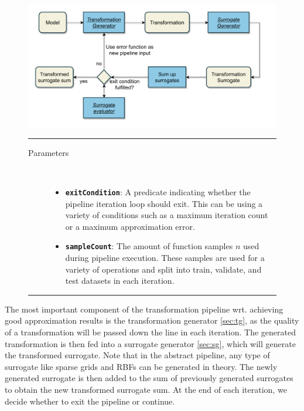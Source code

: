 \documentclass[
  a4paper,  %
  twoside,  %
  bibliography=totoc,
  headsepline,
  cleardoublepage=empty,
  parskip=half,
  draft=false
]{scrbook}
\newcommand{\delimit}{{\color{charcoal}\noindent\rule{\textwidth}{1pt}}}
\begin{document}
\begin{mdframed}[style=style,frametitle={Transformation Pipeline}]
\begin{figure}[H]

\includegraphics[width=\textwidth]{graphics/TransformationPipeline.pdf}
\vspace{-7.5mm}

\delimit

\begin{description}
\item[Parameters] {~ \begin{itemize}[\indent{}]
\item \texttt{\textbf{exitCondition}}: A predicate indicating whether the pipeline iteration loop should exit. This can be using a variety of conditions such as a maximum iteration count or a maximum approximation error.
\item \texttt{\textbf{sampleCount}}: The amount of function samples $n$ used during pipeline execution. These samples are used for a variety of operations and split into train, validate, and test datasets in each iteration.
\end{itemize}}
\end{description}

\delimit

\label{fig:tp}
\end{figure}
\end{mdframed}

The most important component of the transformation pipeline wrt. achieving good approximation results is the transformation generator \cref{sec:tg}, as the quality of a transformation will be passed down the line in each iteration.
The generated transformation is then fed into a surrogate generator \cref{sec:sg}, which will generate the transformed surrogate.
Note that in the abstract pipeline, any type of surrogate like sparse grids and RBFs can be generated in theory.
The newly generated surrogate is then added to the sum of previously generated surrogates to obtain the new transformed surrogate sum.
At the end of each iteration, we decide whether to exit the pipeline or continue.
\end{document}
